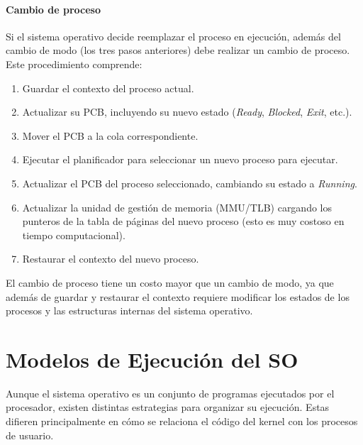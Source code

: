 \paragraph{Cambio de proceso}
Si el sistema operativo decide reemplazar el proceso en ejecución, además del cambio de modo (los tres pasos anteriores) debe realizar un cambio de proceso. Este procedimiento comprende:
\begin{enumerate}
  \item Guardar el contexto del proceso actual.
  \item Actualizar su PCB, incluyendo su nuevo estado (\textit{Ready}, \textit{Blocked}, \textit{Exit}, etc.).
  \item Mover el PCB a la cola correspondiente.
  \item Ejecutar el planificador para seleccionar un nuevo proceso para ejecutar.
  \item Actualizar el PCB del proceso seleccionado, cambiando su estado a \textit{Running}.
  \item Actualizar la unidad de gestión de memoria (MMU/TLB) cargando los punteros de la tabla de páginas del nuevo proceso (esto es muy costoso en tiempo computacional).
  \item Restaurar el contexto del nuevo proceso.
\end{enumerate}
El cambio de proceso tiene un costo mayor que un cambio de modo, ya que además de guardar y restaurar el contexto requiere modificar los estados de los procesos y las estructuras internas del sistema operativo.

\section{Modelos de Ejecución del SO}

Aunque el sistema operativo es un conjunto de programas ejecutados por el procesador, existen distintas estrategias para organizar su ejecución. Estas difieren principalmente en cómo se relaciona el código del kernel con los procesos de usuario.

